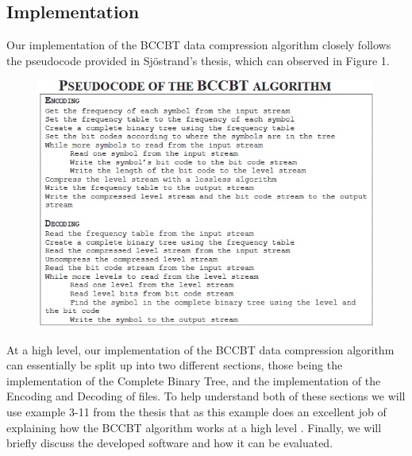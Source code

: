 \documentclass[12pt]{IEEEtran}
\begin{document}
\subsection{Implementation}
Our implementation of the BCCBT data compression algorithm closely follows the pseudocode provided in Sjöstrand's thesis,
which can observed in Figure 1.
\begin{figure}
\centering
\includegraphics[scale=0.55]{../presentation/images/pseudocode.PNG}
\caption{\cite{Sjostrand}}
\end{figure}
At a high level, our implementation of the BCCBT data compression algorithm can essentially be split up into two different sections,
those being the implementation of the Complete Binary Tree, and the implementation of the Encoding and Decoding of files.
To help understand both of these sections we will use example 3-11 from the thesis that as this example does an excellent job of explaining
how the BCCBT algorithm works at a high level \cite{Sjostrand}.
Finally, we will briefly discuss the developed software and how it can be evaluated.
\end{document}
